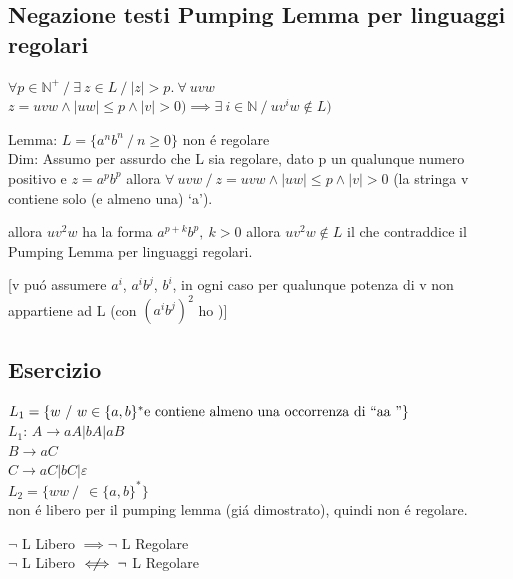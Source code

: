 \subsection{Negazione testi Pumping Lemma per linguaggi regolari}
$\forall p \in \mathbb{N}^+ \ / \ \exists\ z \in L \ / \ |z| > p.\ \forall\ uvw $
$z = uvw \land |uw| \leq p \land |v| > 0) \implies \exists\ i \in \mathbb{N} \ / \ u v^i w \not\in L) $

Lemma: $L=\{a^nb^n \ / \ n \geq 0\}$ non \'e regolare\\
Dim: Assumo per assurdo che L sia regolare, dato p un qualunque numero positivo e $z= a^p b^p $ allora
$\forall\ uvw \ / \ z = uvw \land |uw| \leq p \land |v| > 0$ (la stringa v contiene solo (e almeno una) \lq a\rq ).

allora $uv^2w$ ha la forma $a^{p+k}b^p,\ k > 0$
allora $uv^2w \not\in L$ il che contraddice il Pumping Lemma per linguaggi regolari.

[v pu\'o assumere $a^i$, $a^i b^j$, $b^i$, in ogni caso per qualunque potenza di v non appartiene ad L 
(con $(a^i b^j)^2$ ho )]

\subsection{Esercizio}
$L_1 = \{ w \ / \ w \in \{ a, b \}^* \text{e contiene almeno una occorrenza di \lq\lq aa \rq\rq}\}$\\

$L_1$:
$A \rightarrow aA | bA | aB$\\
$B \rightarrow aC$\\
$C \rightarrow aC | bC | \varepsilon $\\

$L_2 = \{ ww \ / \ \ \in \{ a,b \}^* \}$\\
non \'e libero per il pumping lemma (gi\'a dimostrato), quindi non \'e regolare.

\begin{tcolorbox}\begin{center}
    $\neg $ L Libero $\implies \neg $ L Regolare\\
    $\neg $ L Libero $\centernot\iff \neg $ L Regolare
\end{center}\end{tcolorbox}

